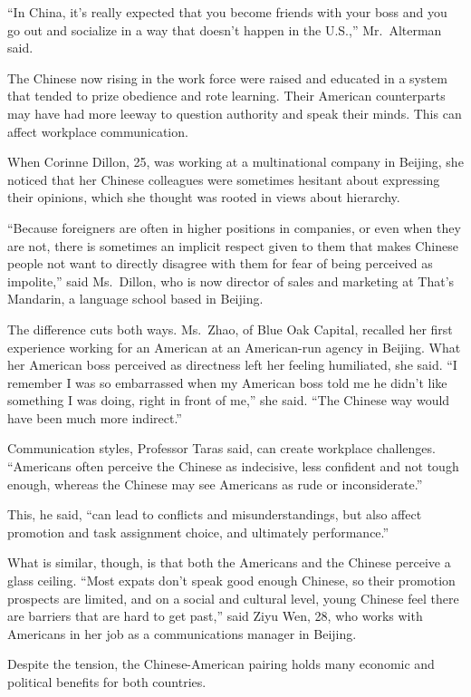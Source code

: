 ﻿\documentclass[12pt]{article}
\begin{document}
``In China, it's really expected that you become friends with your boss and you go out and socialize
in a way that doesn't happen in the U.S.,'' Mr.~Alterman said.

The Chinese now rising in the work force were raised and educated in a system that tended to prize
obedience and rote learning. Their American counterparts may have had more leeway to question
authority and speak their minds. This can affect workplace communication.

When Corinne Dillon, 25, was working at a multinational company in Beijing, she noticed that her
Chinese colleagues were sometimes hesitant about expressing their opinions, which she thought was
rooted in views about hierarchy.

``Because foreigners are often in higher positions in companies, or even when they are not, there is
sometimes an implicit respect given to them that makes Chinese people not want to directly disagree
with them for fear of being perceived as impolite,'' said Ms.~Dillon, who is now director of sales
and marketing at That's Mandarin, a language school based in Beijing.

The difference cuts both ways. Ms.~Zhao, of Blue Oak Capital, recalled her first experience working
for an American at an American-run agency in Beijing. What her American boss perceived as directness
left her feeling humiliated, she said. ``I remember I was so embarrassed when my American boss told
me he didn't like something I was doing, right in front of me,'' she said. ``The Chinese way would
have been much more indirect.''

Communication styles, Professor Taras said, can create workplace challenges. ``Americans often
perceive the Chinese as indecisive, less confident and not tough enough, whereas the Chinese may see
Americans as rude or inconsiderate.''

This, he said, ``can lead to conflicts and misunderstandings, but also affect promotion and task
assignment choice, and ultimately performance.''

What is similar, though, is that both the Americans and the Chinese perceive a glass ceiling. ``Most
expats don't speak good enough Chinese, so their promotion prospects are limited, and on a social
and cultural level, young Chinese feel there are barriers that are hard to get past,'' said Ziyu
Wen, 28, who works with Americans in her job as a communications manager in Beijing.

Despite the tension, the Chinese-American pairing holds many economic and political benefits for
both countries.
\end{document}
